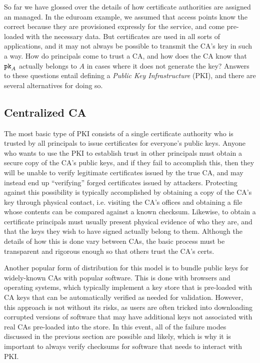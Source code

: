 \documentclass[11pt,twoside]{scrartcl}
\begin{document}
So far we have glossed over the details of how certificate authorities are assigned an managed. In the eduroam example, we assumed that access points know the correct \pk{\eduroam} because they are provisioned expressly for the service, and come pre-loaded with the necessary data. But certificates are used in all sorts of applications, and it may not always be possible to transmit the CA's key in such a way. How do principals come to trust a CA, and how does the CA know that $\texttt{\upshape pk}_{A}$ actually belongs to $A$ in cases where it does not generate the key? Answers to these questions entail defining a \emph{Public Key Infrastructure} (PKI), and there are several alternatives for doing so.

\subsection{Centralized CA}

The most basic type of PKI consists of a single certificate authority who is trusted by all principals to issue certificates for everyone's public keys. Anyone who wants to use the PKI to establish trust in other principals must obtain a secure copy of the CA's public keys, and if they fail to accomplish this, then they will be unable to verify legitimate certificates issued by the true CA, and may instead end up ``verifying'' forged certificates issued by attackers. 
Protecting against this possibility is typically accomplished by obtaining a copy of the CA's key through physical contact, i.e. visiting the CA's offices and obtaining a file whose contents can be compared against a known checksum. Likewise, to obtain a certificate principals must usually present physical evidence of who they are, and that the keys they wish to have signed actually belong to them. Although the details of how this is done vary between CAs, the basic process must be transparent and rigorous enough so that others trust the CA's certs.

Another popular form of distribution for this model is to bundle public keys for widely-known CAs with popular software. This is done with browsers and operating systems, which typically implement a key store that is pre-loaded with CA keys that can be automatically verified as needed for validation. However, this approach is not without its risks, as users are often tricked into downloading corrupted versions of software that may have additional keys not associated with real CAs pre-loaded into the store. In this event, all of the failure modes discussed in the previous section are possible and likely, which is why it is important to always verify checksums for software that needs to interact with PKI.
\end{document}
